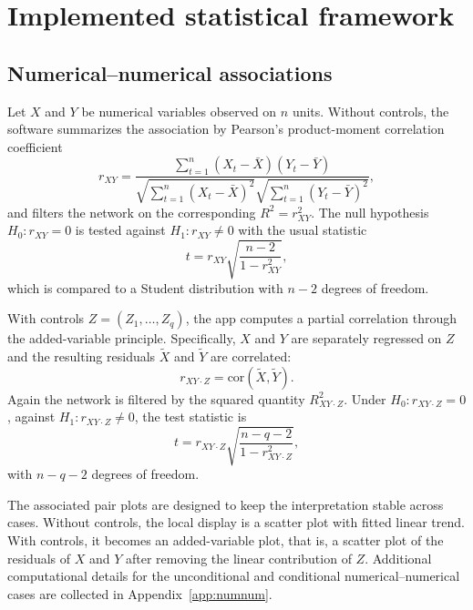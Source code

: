 \documentclass[11pt]{article}
\begin{document}
\section{Implemented statistical framework}
\label{sec:framework}

\subsection{Numerical--numerical associations}
\label{sec:numnum}

Let $X$ and $Y$ be numerical variables observed on $n$ units. Without controls,
the software summarizes the association by Pearson's product-moment correlation
coefficient \citep{Pearson1896}
\begin{equation}
r_{XY} =
\frac{\sum_{t=1}^{n} (X_t - \bar{X})(Y_t - \bar{Y})}
{\sqrt{\sum_{t=1}^{n}(X_t - \bar{X})^2}
 \sqrt{\sum_{t=1}^{n}(Y_t - \bar{Y})^2}},
\label{eq:pearson}
\end{equation}
and filters the network on the corresponding $R^2 = r_{XY}^2$. The null
hypothesis $H_0: r_{XY} = 0$ is tested against
$H_1: r_{XY} \ne 0$ with the usual statistic
\begin{equation*}
t = r_{XY}\sqrt{\frac{n-2}{1-r_{XY}^2}},
\end{equation*}
which is compared to a Student distribution with $n-2$ degrees of freedom.

With controls $Z = (Z_1, \dots, Z_q)$, the app computes a partial correlation
through the added-variable principle. Specifically, $X$ and $Y$ are separately
regressed on $Z$ and the resulting residuals $\tilde{X}$ and $\tilde{Y}$ are
correlated:
\begin{equation*}
r_{XY\cdot Z} = \mathrm{cor}(\tilde{X}, \tilde{Y}).
\end{equation*}
Again the network is filtered by the squared quantity $R^2_{XY\cdot Z}$.
Under $H_0: r_{XY\cdot Z} = 0$, against
$H_1: r_{XY\cdot Z} \ne 0$, the test statistic is
\begin{equation*}
t = r_{XY\cdot Z}\sqrt{\frac{n-q-2}{1-r_{XY\cdot Z}^2}},
\end{equation*}
with $n-q-2$ degrees of freedom.

The associated pair plots are designed to keep the interpretation stable across
cases. Without controls, the local display is a scatter plot with fitted linear
trend. With controls, it becomes an added-variable plot, that is, a scatter
plot of the residuals of $X$ and $Y$ after removing the linear contribution of
$Z$. Additional computational details for the unconditional and conditional
numerical--numerical cases are collected in Appendix~\ref{app:numnum}.
\end{document}

